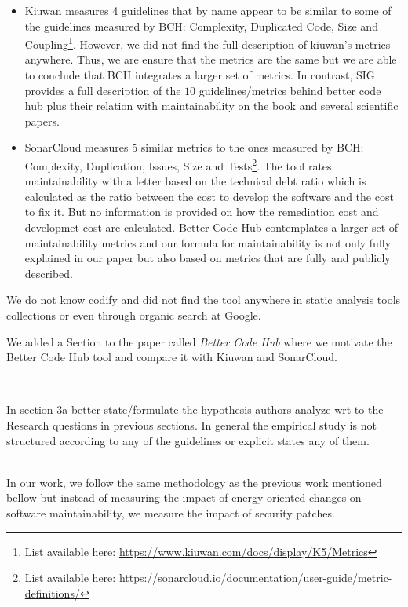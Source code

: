 \documentclass[11pt,fleqn]{article}
\newcommand{\eline}{\vspace*{.75\baselineskip}}
\newcommand{\Referee}[1]{\eline \noindent {\bf Reviewer comment #1:} \\}
\newcommand{\Us}{\eline \noindent {\bf Response:}\\}
\newenvironment{revcomment}[1][]
{\Referee{#1}\begin{rcomment}}
{\end{rcomment}}
\begin{document}
\begin{itemize}
    \item Kiuwan measures 4 guidelines that by name appear to be similar to 
    some of the guidelines measured by BCH: Complexity, Duplicated 
    Code, Size and Coupling\footnote{List available here: \url{https://www.kiuwan.com/docs/display/K5/Metrics}}. 
    However, we did not find the full description of kiuwan's metrics anywhere. Thus, 
    we are ensure that the metrics are the same but we are able to conclude that
    BCH integrates a larger set of metrics.  
    In contrast, 
    SIG provides a full description of the $10$ guidelines/metrics behind better code
    hub plus their relation with maintainability on the book and several scientific papers. 
    \item SonarCloud measures 5 similar metrics to the ones measured by BCH: Complexity, Duplication, 
    Issues, Size and Tests\footnote{List available here: \url{https://sonarcloud.io/documentation/user-guide/metric-definitions/}}. 
    The tool rates maintainability with a letter based on the technical 
    debt ratio which is calculated as the ratio between the cost to develop 
    the software and the cost to fix it. But no information is provided 
    on how the remediation cost and developmet cost are calculated. 
    Better Code Hub contemplates a larger set of maintainability metrics 
    and our formula for maintainability is not only fully explained in our paper but also 
    based on metrics that are fully and publicly described.  
\end{itemize}

We do not know codify and did not find the tool anywhere in static analysis tools 
collections or even through organic search at Google.  

We added a Section to 
the paper called \textit{Better Code Hub} where we motivate the Better Code Hub tool and 
compare it with Kiuwan and SonarCloud.


\begin{revcomment}[3.2]

    In section 3a better state/formulate the hypothesis authors 
    analyze wrt to the Research questions in previous sections. 
    In general the empirical study is not structured according to any 
    of the guidelines or explicit states any of them. 

\end{revcomment}

\Us In our work, we follow the same methodology as the previous work 
mentioned bellow but instead of measuring
the impact of energy-oriented changes on software maintainability, 
we measure the impact of security patches.
\end{document}

